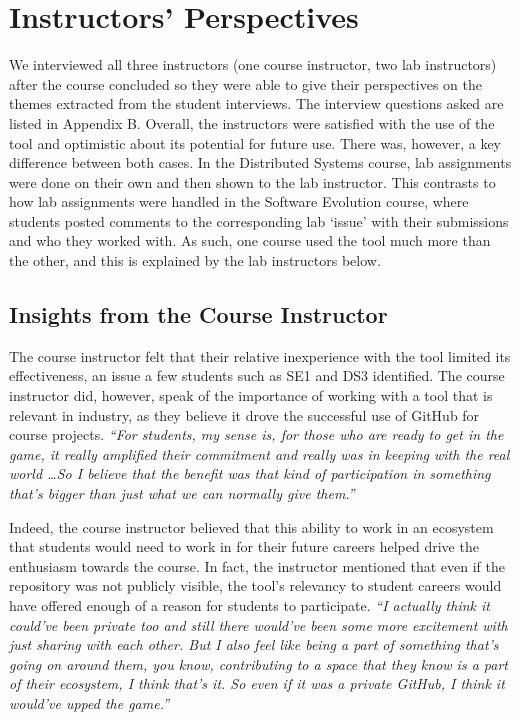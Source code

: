 \section{Instructors' Perspectives}
We interviewed all three instructors (one course instructor, two lab instructors) after the course concluded so they were able to give their perspectives on the themes extracted from the student interviews. The interview questions asked are listed in Appendix B. Overall, the instructors were satisfied with the use of the tool and optimistic about its potential for future use. There was, however, a key difference between both cases. In the Distributed Systems course, lab assignments were done on their own and then shown to the lab instructor. This contrasts to how lab assignments were handled in the Software Evolution course, where students posted comments to the corresponding lab `issue' with their submissions and who they worked with. As such, one course used the tool much more than the other, and this is explained by the lab instructors below.

\subsection{Insights from the Course Instructor}
The course instructor felt that their relative inexperience with the tool limited its effectiveness, an issue a few students such as SE1 and DS3 identified. The course instructor did, however, speak of the importance of working with a tool that is relevant in industry, as they believe it drove the successful use of GitHub for course projects. \textit{``For students, my sense is, for those who are ready to get in the game, it really amplified their commitment and really was in keeping with the real world \ldots So I believe that the benefit was that kind of participation in something that's bigger than just what we can normally give them.''}


Indeed, the course instructor believed that this ability to work in an ecosystem that students would need to work in for their future careers helped drive the enthusiasm towards the course. In fact, the instructor mentioned that even if the repository was not publicly visible, the tool's relevancy to student careers would have offered enough of a reason for students to participate. \textit{``I actually think it could've been private too and still there would've been some more excitement with just sharing with each other. But I also feel like being a part of something that's going on around them, you know, contributing to a space that they know is a part of their ecosystem, I think that's it. So even if it was a private GitHub, I think it would've upped the game.''}

